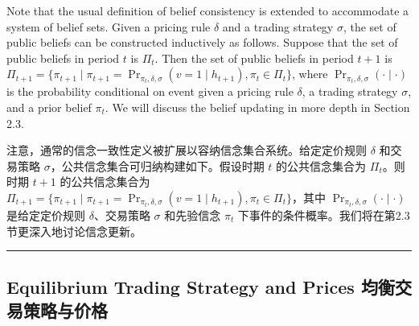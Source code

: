 \documentclass[12pt,a4paper]{article}
\newenvironment{original}{%
  \par\vspace{4pt}\noindent%
  \color{black}%
  \ignorespaces
}{%
  \par\vspace{2pt}%
}
\newenvironment{translation}{%
  \par\vspace{2pt}\noindent%
  \color{transblue}%
  \ignorespaces
}{%
  \par\vspace{4pt}\hrule\vspace{6pt}%
}
\begin{document}
\begin{original}
Note that the usual definition of belief consistency is extended to accommodate a system of belief sets. Given a pricing rule $\delta$ and a trading strategy $\sigma$, the set of public beliefs can be constructed inductively as follows. Suppose that the set of public beliefs in period $t$ is $\Pi_t$. Then the set of public beliefs in period $t+1$ is $\Pi_{t+1} = \{\pi_{t+1} \mid \pi_{t+1} = \Pr_{\pi_t, \delta, \sigma}(v = 1 \mid h_{t+1}), \pi_t \in \Pi_t\}$, where $\Pr_{\pi_t, \delta, \sigma}(\cdot \mid \cdot)$ is the probability conditional on event given a pricing rule $\delta$, a trading strategy $\sigma$, and a prior belief $\pi_t$. We will discuss the belief updating in more depth in Section 2.3.
\end{original}
\begin{translation}
注意，通常的信念一致性定义被扩展以容纳信念集合系统。给定定价规则 $\delta$ 和交易策略 $\sigma$，公共信念集合可归纳构建如下。假设时期 $t$ 的公共信念集合为 $\Pi_t$。则时期 $t+1$ 的公共信念集合为 $\Pi_{t+1} = \{\pi_{t+1} \mid \pi_{t+1} = \Pr_{\pi_t, \delta, \sigma}(v = 1 \mid h_{t+1}), \pi_t \in \Pi_t\}$，其中 $\Pr_{\pi_t, \delta, \sigma}(\cdot \mid \cdot)$ 是给定定价规则 $\delta$、交易策略 $\sigma$ 和先验信念 $\pi_t$ 下事件的条件概率。我们将在第2.3节更深入地讨论信念更新。
\end{translation}


\subsection{Equilibrium Trading Strategy and Prices \hfill 均衡交易策略与价格}
\end{document}
